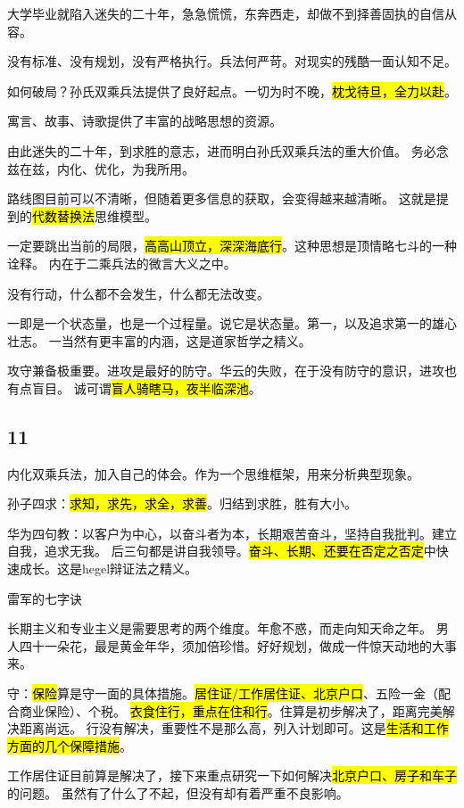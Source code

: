 \hrulefill

大学毕业就陷入迷失的二十年，急急慌慌，东奔西走，却做不到择善固执的自信从容。

没有标准、没有规划，没有严格执行。兵法何严苛。对现实的残酷一面认知不足。

如何破局？孙氏双乘兵法提供了良好起点。一切为时不晚，\hl{枕戈待旦，全力以赴}。

寓言、故事、诗歌提供了丰富的战略思想的资源。

由此迷失的二十年，到求胜的意志，进而明白孙氏双乘兵法的重大价值。
务必念兹在兹，内化、优化，为我所用。

路线图目前可以不清晰，但随着更多信息的获取，会变得越来越清晰。
这就是提到的\hl{代数替换法}思维模型。

一定要跳出当前的局限，\hl{高高山顶立，深深海底行}。这种思想是顶情略七斗的一种诠释。
内在于二乘兵法的微言大义之中。

没有行动，什么都不会发生，什么都无法改变。

一即是一个状态量，也是一个过程量。说它是状态量。第一，以及追求第一的雄心壮志。
一当然有更丰富的内涵，这是道家哲学之精义。

攻守兼备极重要。进攻是最好的防守。华云的失败，在于没有防守的意识，进攻也有点盲目。
诚可谓\hl{盲人骑瞎马，夜半临深池}。

\subsection{11}

内化双乘兵法，加入自己的体会。作为一个思维框架，用来分析典型现象。

孙子四求：\hl{求知，求先，求全，求善}。归结到求胜，胜有大小。

华为四句教：以客户为中心，以奋斗者为本，长期艰苦奋斗，坚持自我批判。建立自我，追求无我。
后三句都是讲自我领导。\hl{奋斗、长期、还要在否定之否定}中快速成长。这是hegel辩证法之精义。

雷军的七字诀

\hrulefill

长期主义和专业主义是需要思考的两个维度。年愈不惑，而走向知天命之年。
男人四十一朵花，最是黄金年华，须加倍珍惜。好好规划，做成一件惊天动地的大事来。

守：\hl{保险}算是守一面的具体措施。\hl{居住证/工作居住证、北京户口}、五险一金（配合商业保险）、个税。
\hl{衣食住行，重点在住和行}。住算是初步解决了，距离完美解决距离尚远。
行没有解决，重要性不是那么高，列入计划即可。这是\hl{生活和工作方面的几个保障措施}。

工作居住证目前算是解决了，接下来重点研究一下如何解决\hl{北京户口、房子和车子}的问题。
虽然有了什么了不起，但没有却有着严重不良影响。

